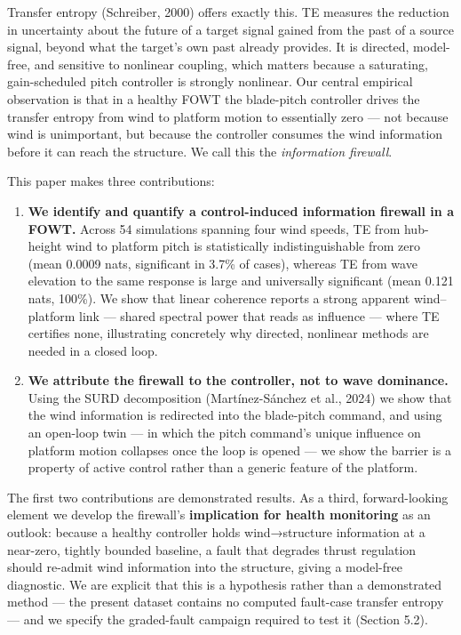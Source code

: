 \documentclass[
  english,
  11pt,
]{article}
\begin{document}
Transfer entropy (Schreiber, 2000) offers exactly this. TE measures the
reduction in uncertainty about the future of a target signal gained from
the past of a source signal, beyond what the target's own past already
provides. It is directed, model-free, and sensitive to nonlinear
coupling, which matters because a saturating, gain-scheduled pitch
controller is strongly nonlinear. Our central empirical observation is
that in a healthy FOWT the blade-pitch controller drives the transfer
entropy from wind to platform motion to essentially zero --- not because
wind is unimportant, but because the controller consumes the wind
information before it can reach the structure. We call this the
\emph{information firewall}.

This paper makes three contributions:

\begin{enumerate}
\def\labelenumi{\arabic{enumi}.}
\item
  \textbf{We identify and quantify a control-induced information
  firewall in a FOWT.} Across 54 simulations spanning four wind speeds,
  TE from hub-height wind to platform pitch is statistically
  indistinguishable from zero (mean 0.0009 nats, significant in 3.7\% of
  cases), whereas TE from wave elevation to the same response is large
  and universally significant (mean 0.121 nats, 100\%). We show that
  linear coherence reports a strong apparent wind--platform link ---
  shared spectral power that reads as influence --- where TE certifies
  none, illustrating concretely why directed, nonlinear methods are
  needed in a closed loop.
\item
  \textbf{We attribute the firewall to the controller, not to wave
  dominance.} Using the SURD decomposition (Martínez-Sánchez et al.,
  2024) we show that the wind information is redirected into the
  blade-pitch command, and using an open-loop twin --- in which the
  pitch command's unique influence on platform motion collapses once the
  loop is opened --- we show the barrier is a property of active control
  rather than a generic feature of the platform.
\end{enumerate}

The first two contributions are demonstrated results. As a third,
forward-looking element we develop the firewall's \textbf{implication
for health monitoring} as an outlook: because a healthy controller holds
wind→structure information at a near-zero, tightly bounded baseline, a
fault that degrades thrust regulation should re-admit wind information
into the structure, giving a model-free diagnostic. We are explicit that
this is a hypothesis rather than a demonstrated method --- the present
dataset contains no computed fault-case transfer entropy --- and we
specify the graded-fault campaign required to test it (Section 5.2).
\end{document}
